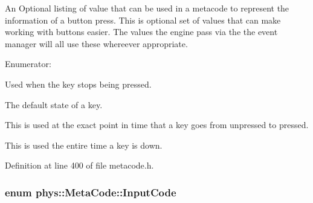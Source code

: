An Optional listing of value that can be used in a metacode to represent the information of a button press. This is optional set of values that can make working with buttons easier. The values the engine pass via the the event manager will all use these whereever appropriate. \begin{Desc}
\item[Enumerator: ]\par
\begin{description}
\item[{\em 
\hypertarget{classphys_1_1MetaCode_a2fdfb26b3e50ceb0ccc60bfc4c3d6ac2a6b5564408703517f36debd8c423e2dee}{
BUTTON\_\-LIFTING}
\label{da/dc9/classphys_1_1MetaCode_a2fdfb26b3e50ceb0ccc60bfc4c3d6ac2a6b5564408703517f36debd8c423e2dee}
}]Used when the key stops being pressed. \item[{\em 
\hypertarget{classphys_1_1MetaCode_a2fdfb26b3e50ceb0ccc60bfc4c3d6ac2ae275c52779b0f6ec37533af256a70cc3}{
BUTTON\_\-UP}
\label{da/dc9/classphys_1_1MetaCode_a2fdfb26b3e50ceb0ccc60bfc4c3d6ac2ae275c52779b0f6ec37533af256a70cc3}
}]The default state of a key. \item[{\em 
\hypertarget{classphys_1_1MetaCode_a2fdfb26b3e50ceb0ccc60bfc4c3d6ac2a33669b2b9ca814664296da55702e412d}{
BUTTON\_\-PRESSING}
\label{da/dc9/classphys_1_1MetaCode_a2fdfb26b3e50ceb0ccc60bfc4c3d6ac2a33669b2b9ca814664296da55702e412d}
}]This is used at the exact point in time that a key goes from unpressed to pressed. \item[{\em 
\hypertarget{classphys_1_1MetaCode_a2fdfb26b3e50ceb0ccc60bfc4c3d6ac2a5b52ee1db94dbc2db23f3b4c267b5438}{
BUTTON\_\-DOWN}
\label{da/dc9/classphys_1_1MetaCode_a2fdfb26b3e50ceb0ccc60bfc4c3d6ac2a5b52ee1db94dbc2db23f3b4c267b5438}
}]This is used the entire time a key is down. \end{description}
\end{Desc}



Definition at line 400 of file metacode.h.\hypertarget{classphys_1_1MetaCode_a3e501cbb5bf0f6f1fdb7211465bda8d8}{
\subsubsection[{InputCode}]{\setlength{\rightskip}{0pt plus 5cm}enum {\bf phys::MetaCode::InputCode}}}
\label{da/dc9/classphys_1_1MetaCode_a3e501cbb5bf0f6f1fdb7211465bda8d8}


